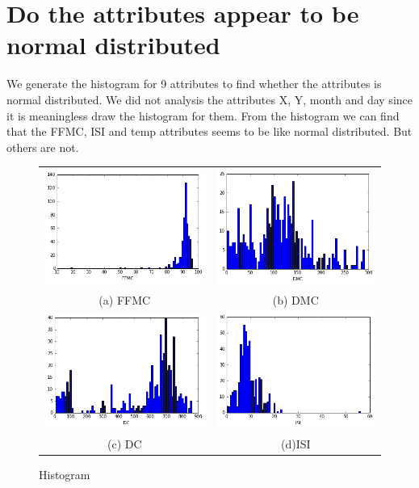 
\section*{Do the attributes appear to be normal distributed}
We generate the histogram for 9 attributes to find whether the attributes is normal distributed. We did not analysis the attributes X, Y, month and day since it is meaningless draw the histogram for them. From the histogram we can find that the FFMC, ISI and temp attributes seems to be like normal distributed. But others are not. 

\begin{figure}
\begin{tabular}{cc}
  \includegraphics[width=65mm]{images/hist/FFMC.png} &   \includegraphics[width=65mm]{images/hist/DMC.png} \\
(a) FFMC & (b) DMC \\[6pt]
 \includegraphics[width=65mm]{images/hist/DC.png} &   \includegraphics[width=65mm]{images/hist/ISI.png} \\
(c) DC & (d)ISI \\[6pt]

\end{tabular}
\caption{Histogram}
\end{figure}

